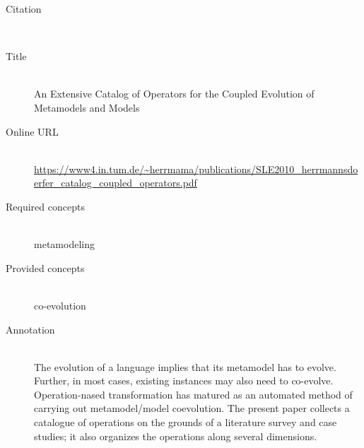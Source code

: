 \begin{description}
\item[Citation]\mbox{}\\
\cite{HerrmannsdoerferVW11}
\item[Title]\mbox{}\\
An Extensive Catalog of Operators for the Coupled Evolution of Metamodels and Models
\item[Online URL]\mbox{}\\
{\footnotesize\url{https://www4.in.tum.de/~herrmama/publications/SLE2010_herrmannsdoerfer_catalog_coupled_operators.pdf}}
\item[Required concepts]\mbox{}\\
metamodeling\item[Provided concepts]\mbox{}\\
co-evolution\item[Annotation]\mbox{}\\
The evolution of a language implies that its metamodel has to evolve. Further, in most cases, existing instances may also need to co-evolve. Operation-nased transformation has matured as an automated method of carrying out metamodel/model coevolution. The present paper collects a catalogue of operations on the grounds of a literature survey and case studies; it also organizes the operations along several dimensions.
\end{description}

